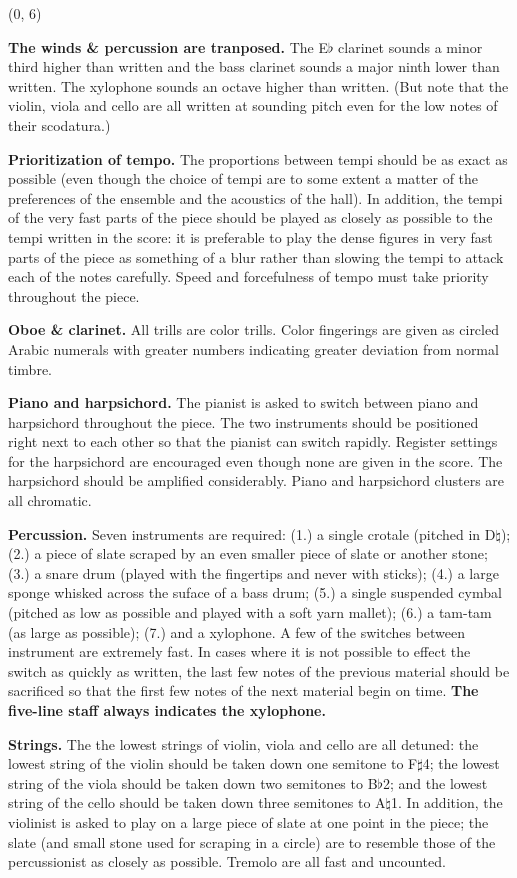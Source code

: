 \documentclass[10pt]{article}
\begin{document}
\begin{textblock}{23}(0, 6)

\textbf{The winds \& percussion are tranposed.} The E$\flat$ clarinet sounds a
minor third higher than written and the bass clarinet sounds a major ninth
lower than written. The xylophone sounds an octave higher than written. (But
note that the violin, viola and cello are all written at sounding pitch even
for the low notes of their scodatura.)

\textbf{Prioritization of tempo.} The proportions between tempi should be as
exact as possible (even though the choice of tempi are to some extent a matter
of the preferences of the ensemble and the acoustics of the hall). In addition,
the tempi of the very fast parts of the piece should be played as closely as
possible to the tempi written in the score: it is preferable to play the dense
figures in very fast parts of the piece as something of a blur rather than
slowing the tempi to attack each of the notes carefully. Speed and forcefulness
of tempo must take priority throughout the piece.

\textbf{Oboe \& clarinet.} All trills are color trills. Color fingerings are
given as circled Arabic numerals with greater numbers indicating greater
deviation from normal timbre.

\textbf{Piano and harpsichord.} The pianist is asked to switch between piano
and harpsichord throughout the piece. The two instruments should be positioned
right next to each other so that the pianist can switch rapidly. Register
settings for the harpsichord are encouraged even though none are given in the
score. The harpsichord should be amplified considerably. Piano and harpsichord
clusters are all chromatic.

\textbf{Percussion.} Seven instruments are required: (1.) a single crotale
(pitched in D$\natural$); (2.) a piece of slate scraped by an even smaller
piece of slate or another stone; (3.) a snare drum (played with the fingertips
and never with sticks); (4.) a large sponge whisked across the suface of a bass
drum; (5.) a single suspended cymbal (pitched as low as possible and played
with a soft yarn mallet); (6.) a tam-tam (as large as possible); (7.) and a
xylophone. A few of the switches between instrument are extremely fast. In
cases where it is not possible to effect the switch as quickly as written, the
last few notes of the previous material should be sacrificed so that the first
few notes of the next material begin on time. \textbf{The five-line staff always
indicates the xylophone.}

\textbf{Strings.} The the lowest strings of violin, viola and cello are all
detuned: the lowest string of the violin should be taken down one semitone to
F$\sharp$4; the lowest string of the viola should be taken down two semitones
to B$\flat$2; and the lowest string of the cello should be taken down three
semitones to A$\natural$1. In addition, the violinist is asked to play on a
large piece of slate at one point in the piece; the slate (and small stone used
for scraping in a circle) are to resemble those of the percussionist as closely
as possible. Tremolo are all fast and uncounted.

\end{textblock}
\end{document}
